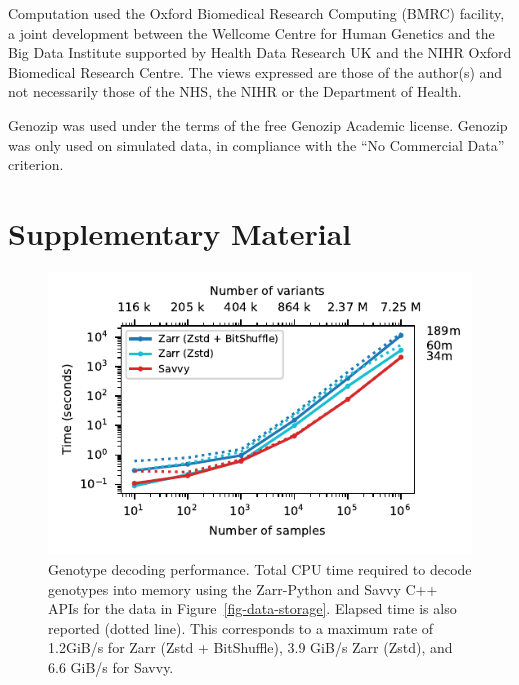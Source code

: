 \documentclass[a4paper,num-refs]{oup-contemporary}
\begin{document}
Computation used the Oxford Biomedical Research Computing (BMRC) facility, a
joint development between the Wellcome Centre for Human Genetics and the Big
Data Institute supported by Health Data Research UK and the NIHR Oxford
Biomedical Research Centre. The views expressed are those of the author(s) and
not necessarily those of the NHS, the NIHR or the Department of Health.

Genozip was used under the terms of the free Genozip Academic license.
Genozip was only used on simulated data, in compliance with
the ``No Commercial Data'' criterion.



\renewcommand\thefigure{S\arabic{figure}}
\setcounter{figure}{0}
\renewcommand\thetable{S\arabic{table}}
\setcounter{table}{0}

\section*{Supplementary Material}

\begin{figure}[h]
\includegraphics{figures/whole-matrix-decode}
\caption{Genotype decoding performance.
Total CPU time required to decode genotypes into memory using the Zarr-Python
and Savvy C++ APIs for the data in Figure~\ref{fig-data-storage}.
Elapsed time is also reported (dotted line). 
This corresponds to a maximum rate of 1.2GiB/s for Zarr (Zstd + BitShuffle),
3.9 GiB/s Zarr (Zstd), and 6.6 GiB/s for Savvy. 
\label{fig-whole-matrix-decode}}
\end{figure}
\end{document}
